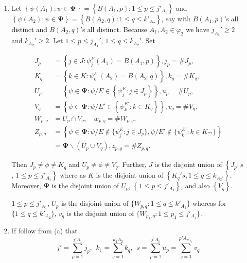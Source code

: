 \documentclass[a4paper,12pt]{article}
\theoremstyle{definition}
\theoremstyle{underlinethm}
\theoremstyle{definition}
\begin{document}
\begin{enumerate}[label=(\alph*)]
\item Let $\left\{\psi(A_{1}) : \psi \in \boldsymbol{\Psi}\right\} = \left\{B(A_{1}, p) : 1 \leq p \leq j'_{A_{1}}\right\}$ and\\ $\left\{\psi (A_{2}) : \psi \in \boldsymbol{\Psi}\right\} = \left\{B(A_{2}, q) : 1 \leq q \leq k'_{A_{2}}\right\}$, say with $B(A_{1}, p)$'s all distinct and $B(A_{2}, q)$'s all distinct. Because $A_{1}, A_{2} \in \varphi_{2}$ we have $j_{A_{1}}' \geq 2$ and $k_{A_{2}}' \geq 2$. Let $1 \leq p \leq j_{A_{1}}'$, $1 \leq q \leq k_{A_{2}}'$. Set 

\begin{align*}
J_{p} &= \left\{j \in J  : \psi_{j}^{E} (A_{1}) = B(A_{1}, p)\right\}, j_{p} = \# J_{p},\\
K_{q} & = \left\{k \in K : \psi_{k}^{E'} (A_{2}) = B(A_{2}, q)\right\}, k_{q} = \# K_{q},\\
U_{p} & = \left\{\psi \in \boldsymbol{\Psi} : \psi / E \in \left\{\psi_{j}^{E} : j \in J_{p}\right\}\right\}, u_{p} = \# U_{p},\\
V_{q} & = \left\{\psi \in \boldsymbol{\Psi} : \psi/E' \in \left\{\psi_{k}^{E'} : k \in K_{q}\right\} \right\}, v_{q} = \# V_{q},\\
W_{p,q} & = U_{p} \cap V_{q},\quad w_{p, q} = \# W_{p,q},\\
Z_{p,q} & = \left\{\psi \in \boldsymbol{\Psi} : \psi /E \notin \{ \psi_{j}^{E} : j \in J_{p}\}, \psi/E' \notin \{\psi_{k}^{E'} : k \in K_{??}\} \right\}\\
 & = \boldsymbol{\Psi} \smallsetminus (U_{p} \cup V_{q}), z_{p,q} = \# Z_{p,q}.
\end{align*}

Then $J_{p} \neq \phi \neq K_{q}$ and $U_{p} \neq \phi \neq V_{q}$. Further, $J$ is the disjoint union of $\left\{J_{p} : s\right.$, $\left.1 \leq p \leq j'_{A_{1}}\right\}$ where as $K$ is the disjoint union of $\left\{K_{q}'s, 1 \leq q \leq k_{A_{2}'}\right\}$. Moreover, $\boldsymbol{\Psi}$ is the disjoint union of $U_{p} $, $\left\{1 \leq p \leq j'_{A_{1}}\right\}$, and also $\left\{V_{q}\right\}$.

$1 \leq p \leq j'_{A_{1}}$, $U_{p}$ is the disjoint union of $\{W_{p,q} : 1 \leq q \leq k'_{A_{2}} \}$ whereas for $\{1 \leq q \leq k'_{A_{2}}\}$, $v_{q}$ is the disjoint union of $\{W_{p_{1},q} : 1 \leq p_{1} \leq j'_{A_{1}}\}$.

\item If follow from (a) that 
\begin{equation}
j' = \sum_{p=1}^{j'A_{1}} j_{p}, ~~ k_{1} = \sum_{q=1}^{k_{1}A_{2}} k_{q},~~ s= \sum_{p=1}^{j'A_{1}} u_{p}= \sum_{q=1}^{p'A_{k'_{A_{2}}}}v_{q}\tag{3.62}\label{eq-3.62}
\end{equation}


\end{enumerate}
\end{document}
